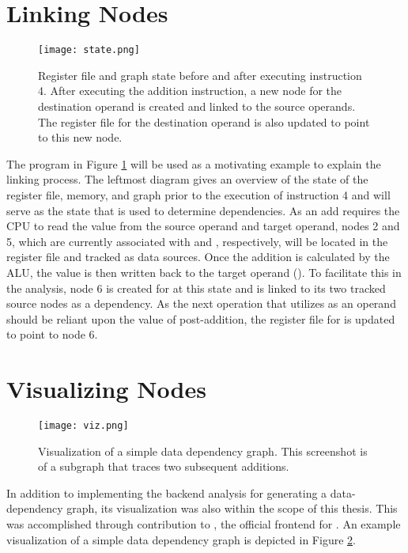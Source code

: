 \section{Linking Nodes}
\begin{figure}
    \centering
    \texttt{[image: state.png]}
    \caption[Register File and Graph State Before and After Executing Instruction 4]{Register file and graph state before and after executing instruction 4. After executing the addition instruction, a new node for the destination operand is created and linked to the source operands. The register file for the destination operand is also updated to point to this new node.}
    \label{fig:link}
\end{figure}
The program in Figure \ref{fig:link} will be used as a motivating example to explain the linking process. The leftmost diagram gives an overview of the state of the register file, memory, and graph prior to the execution of instruction 4 and will serve as the state that is used to determine dependencies. As an add requires the CPU to read the value from the source operand and target operand, nodes 2 and 5, which are currently associated with  and , respectively, will be located in the register file and tracked as data sources. Once the addition is calculated by the ALU, the value is then written back to the target operand (). To facilitate this in the analysis, node 6 is created for  at this state and is linked to its two tracked source nodes as a dependency. As the next operation that utilizes  as an operand should be reliant upon the value of  post-addition, the register file for  is updated to point to node 6.

\section{Visualizing Nodes}
\begin{figure}
    \centering
    \texttt{[image: viz.png]}
    \caption[{Visualization of a Simple Data Dependency Graph}]{Visualization of a simple data dependency graph. This screenshot is of a subgraph that traces two subsequent additions.}
    \label{fig:viz}
\end{figure}

In addition to implementing the backend analysis for generating a data-dependency graph, its visualization was also within the scope of this thesis. This was accomplished through contribution to , the official frontend for . An example visualization of a simple data dependency graph is depicted in Figure \ref{fig:viz}.

